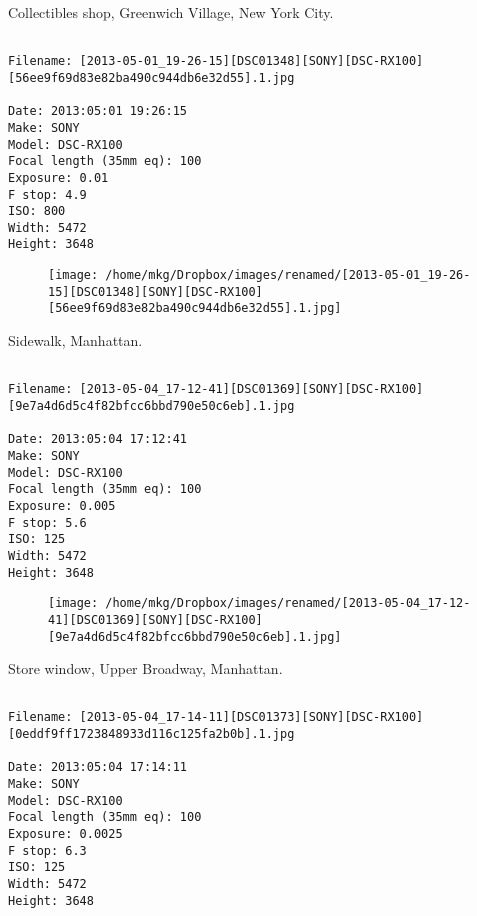 \clearpage
\onecolumn
\noindent Collectibles shop, Greenwich Village, New York City.
\noindent
\begin{lstlisting}

Filename: [2013-05-01_19-26-15][DSC01348][SONY][DSC-RX100][56ee9f69d83e82ba490c944db6e32d55].1.jpg

Date: 2013:05:01 19:26:15
Make: SONY
Model: DSC-RX100
Focal length (35mm eq): 100
Exposure: 0.01
F stop: 4.9
ISO: 800
Width: 5472
Height: 3648
\end{lstlisting}
\clearpage

\begin{figure}
\texttt{[image: /home/mkg/Dropbox/images/renamed/[2013-05-01\_19-26-15][DSC01348][SONY][DSC-RX100][56ee9f69d83e82ba490c944db6e32d55].1.jpg]}
\end{figure}
    
\clearpage
\onecolumn
\noindent Sidewalk, Manhattan.
\noindent
\begin{lstlisting}

Filename: [2013-05-04_17-12-41][DSC01369][SONY][DSC-RX100][9e7a4d6d5c4f82bfcc6bbd790e50c6eb].1.jpg

Date: 2013:05:04 17:12:41
Make: SONY
Model: DSC-RX100
Focal length (35mm eq): 100
Exposure: 0.005
F stop: 5.6
ISO: 125
Width: 5472
Height: 3648
\end{lstlisting}
\clearpage

\begin{figure}
\texttt{[image: /home/mkg/Dropbox/images/renamed/[2013-05-04\_17-12-41][DSC01369][SONY][DSC-RX100][9e7a4d6d5c4f82bfcc6bbd790e50c6eb].1.jpg]}
\end{figure}
    
\clearpage
\onecolumn
\noindent Store window, Upper Broadway, Manhattan.
\noindent
\begin{lstlisting}

Filename: [2013-05-04_17-14-11][DSC01373][SONY][DSC-RX100][0eddf9ff1723848933d116c125fa2b0b].1.jpg

Date: 2013:05:04 17:14:11
Make: SONY
Model: DSC-RX100
Focal length (35mm eq): 100
Exposure: 0.0025
F stop: 6.3
ISO: 125
Width: 5472
Height: 3648
\end{lstlisting}
\clearpage

